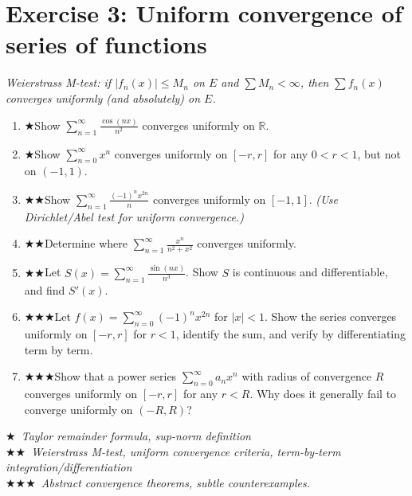 \documentclass[12pt,a4paper]{article}
\newcommand{\easy}{{\color{green!60!black}$\bigstar$}}
\newcommand{\medium}{{\color{orange}$\bigstar\bigstar$}}
\newcommand{\hard}{{\color{red}$\bigstar\bigstar\bigstar$}}
\begin{document}
\section*{Exercise 3: Uniform convergence of series of functions}

\emph{Weierstrass M-test: if $|f_n(x)|\le M_n$ on $E$ and $\sum M_n < \infty$,
then $\sum f_n(x)$ converges uniformly (and absolutely) on $E$.}

\begin{enumerate}[leftmargin=*, label=(\alph*)]

\item \easy\quad Show $\displaystyle\sum_{n=1}^{\infty}\frac{\cos(nx)}{n^2}$ converges
uniformly on $\mathbb{R}$.

\item \easy\quad Show $\displaystyle\sum_{n=0}^{\infty}x^n$ converges uniformly on $[-r,r]$
for any $0<r<1$, but not on $(-1,1)$.

\item \medium\quad Show $\displaystyle\sum_{n=1}^{\infty}\frac{(-1)^n x^{2n}}{n}$
converges uniformly on $[-1,1]$.
\quad\emph{(Use Dirichlet/Abel test for uniform convergence.)}

\item \medium\quad Determine where $\displaystyle\sum_{n=1}^{\infty}\frac{x^n}{n^2+x^2}$
converges uniformly.

\item \medium\quad Let $S(x) = \displaystyle\sum_{n=1}^{\infty}\frac{\sin(nx)}{n^3}$.
Show $S$ is continuous and differentiable, and find $S'(x)$.

\item \hard\quad Let $f(x) = \displaystyle\sum_{n=0}^{\infty}(-1)^n x^{2n}$ for $|x|<1$.
Show the series converges uniformly on $[-r,r]$ for $r<1$,
identify the sum, and verify by differentiating term by term.

\item \hard\quad Show that a power series $\displaystyle\sum_{n=0}^{\infty}a_n x^n$
with radius of convergence $R$ converges uniformly on $[-r,r]$ for any $r<R$.
Why does it generally fail to converge uniformly on $(-R,R)$?

\end{enumerate}

\bigskip
\begin{center}
\small\itshape
\easy\ Taylor remainder formula, sup-norm definition\\
\medium\ Weierstrass M-test, uniform convergence criteria, term-by-term integration/differentiation\\
\hard\ Abstract convergence theorems, subtle counterexamples.
\end{center}
\end{document}
